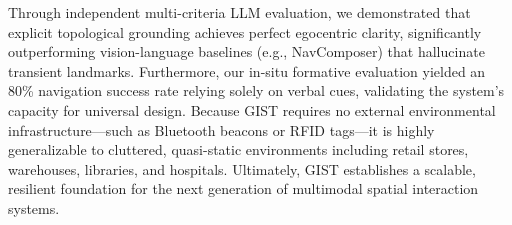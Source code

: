 \documentclass[sigconf,anonymous,review]{acmart}
\begin{document}
Through independent multi-criteria LLM evaluation, we demonstrated that explicit topological grounding achieves perfect egocentric clarity, significantly outperforming vision-language baselines (e.g., NavComposer) that hallucinate transient landmarks. Furthermore, our in-situ formative evaluation yielded an 80\% navigation success rate relying solely on verbal cues, validating the system's capacity for universal design. Because GIST requires no external environmental infrastructure—such as Bluetooth beacons or RFID tags—it is highly generalizable to cluttered, quasi-static environments including retail stores, warehouses, libraries, and hospitals. Ultimately, GIST establishes a scalable, resilient foundation for the next generation of multimodal spatial interaction systems.



\end{document}
